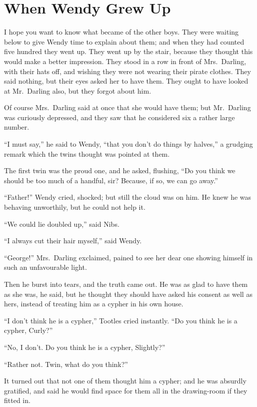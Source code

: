 \chapter{When Wendy Grew Up}

I hope you want to know what became of the other boys. They were
waiting below to give Wendy time to explain about them; and when they
had counted five hundred they went up. They went up by the stair,
because they thought this would make a better impression. They stood in
a row in front of Mrs.\ Darling, with their hats off, and wishing they
were not wearing their pirate clothes. They said nothing, but their
eyes asked her to have them. They ought to have looked at Mr.\ Darling
also, but they forgot about him.

Of course Mrs.\ Darling said at once that she would have them; but Mr.\ Darling was curiously depressed, and they saw that he considered six a
rather large number.

``I must say,'' he said to Wendy, ``that you don't do things by halves,'' a
grudging remark which the twins thought was pointed at them.

The first twin was the proud one, and he asked, flushing, ``Do you think
we should be too much of a handful, sir? Because, if so, we can go
away.''

``Father!'' Wendy cried, shocked; but still the cloud was on him. He knew
he was behaving unworthily, but he could not help it.

``We could lie doubled up,'' said Nibs.

``I always cut their hair myself,'' said Wendy.

``George!'' Mrs.\ Darling exclaimed, pained to see her dear one showing
himself in such an unfavourable light.

Then he burst into tears, and the truth came out. He was as glad to
have them as she was, he said, but he thought they should have asked
his consent as well as hers, instead of treating him as a cypher in his
own house.

``I don't think he is a cypher,'' Tootles cried instantly. ``Do you think
he is a cypher, Curly?''

``No, I don't. Do you think he is a cypher, Slightly?''

``Rather not. Twin, what do you think?''

It turned out that not one of them thought him a cypher; and he was
absurdly gratified, and said he would find space for them all in the
drawing-room if they fitted in.

